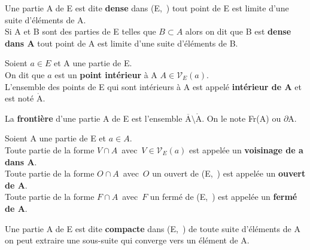 \vspace{1cm}

Une partie A de E est dite \textbf{dense} dans (E,\ \normtxt{\ }) \ssi tout point de E est limite d'une suite d'éléments de A.\\
Si A et B sont des parties de E telles que \(B\subset A\) alors on dit que B est \textbf{dense dans A} \ssi tout point de A est limite d'une suite d'éléments de B.

\vspace{1cm}

Soient \(a\in E\) et A une partie de E.\\
On dit que \(a\) est un \textbf{point intérieur} à A \ssi \(A\in \mathcal{V}_E(a)\).\\
L'ensemble des points de E qui sont intérieurs à A est appelé \textbf{intérieur de A} et est noté \(\mathring{\text{A}}\).

\vspace{1cm}

La \textbf{frontière} d'une partie A de E est l'ensemble \(\overline{\text{A}}\setminus \mathring{\text{A}}\). On le note Fr(A) ou \(\partial\)A.

\vspace{1cm}

Soient A une partie de E et \(a\in A\).\vspace{0.1cm}\\
Toute partie de la forme \(V\cap A\) \,avec\, \(V\in \mathcal{V}_E(a)\) est appelée un \textbf{voisinage de a dans A}.\vspace{0.1cm}\\
Toute partie de la forme \(O\cap A\) \,avec\, $O$ un ouvert de (E,\ \normtxt{\ }) est appelée un \textbf{ouvert de A}.\vspace{0.1cm}\\
Toute partie de la forme \(F\cap A\) \,avec\, $F$ un fermé de (E,\ \normtxt{\ }) est appelée un \textbf{fermé de A}.

\vspace{1.2cm}

Une partie A de E est dite \textbf{compacte} dans (E,\ \normtxt{\ }) \ssi de toute suite d'éléments de A on peut extraire une sous-suite qui converge vers un élément de A.

\vspace{1.2cm}

